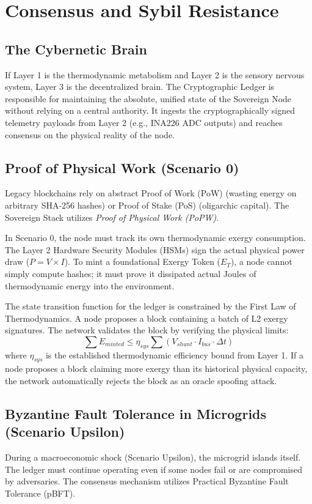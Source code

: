 \chapter{Consensus and Sybil Resistance}

\section{The Cybernetic Brain}
If Layer 1 is the thermodynamic metabolism and Layer 2 is the sensory nervous system, Layer 3 is the decentralized brain. The Cryptographic Ledger is responsible for maintaining the absolute, unified state of the Sovereign Node without relying on a central authority. It ingests the cryptographically signed telemetry payloads from Layer 2 (e.g., INA226 ADC outputs) and reaches consensus on the physical reality of the node.

\section{Proof of Physical Work (Scenario 0)}
Legacy blockchains rely on abstract Proof of Work (PoW) (wasting energy on arbitrary SHA-256 hashes) or Proof of Stake (PoS) (oligarchic capital). The Sovereign Stack utilizes \textit{Proof of Physical Work (PoPW)}. 

In Scenario 0, the node must track its own thermodynamic exergy consumption. The Layer 2 Hardware Security Modules (HSMs) sign the actual physical power draw ($P = V \times I$). To mint a foundational Exergy Token ($E_T$), a node cannot simply compute hashes; it must prove it dissipated actual Joules of thermodynamic energy into the environment. 

The state transition function for the ledger is constrained by the First Law of Thermodynamics. A node proposes a block containing a batch of L2 exergy signatures. The network validates the block by verifying the physical limits:
\begin{equation}
\sum E_{minted} \le \eta_{sys} \sum \left( V_{shunt} \cdot I_{bus} \cdot \Delta t \right)
\end{equation}
where $\eta_{sys}$ is the established thermodynamic efficiency bound from Layer 1. If a node proposes a block claiming more exergy than its historical physical capacity, the network automatically rejects the block as an oracle spoofing attack.

\section{Byzantine Fault Tolerance in Microgrids (Scenario Upsilon)}
During a macroeconomic shock (Scenario Upsilon), the microgrid islands itself. The ledger must continue operating even if some nodes fail or are compromised by adversaries. The consensus mechanism utilizes Practical Byzantine Fault Tolerance (pBFT). 

